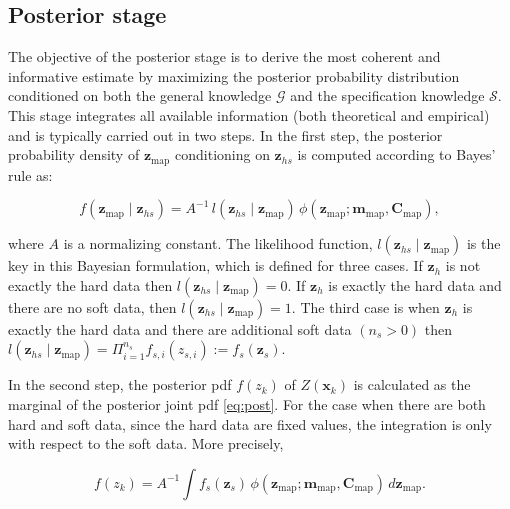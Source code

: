 \subsection{Posterior stage}\label{posterior-stage}

The objective of the posterior stage is to derive the most coherent and informative estimate by maximizing the posterior probability distribution conditioned on both the general knowledge \(\mathcal{G}\) and the specification knowledge \(\mathcal{S}\). This stage integrates all available information (both theoretical and empirical) and is typically carried out in two steps. In the first step, the posterior probability density of \(\boldsymbol{z}_\mathrm{map}\) conditioning on \(\boldsymbol{z}_{hs}\) is computed according to Bayes' rule as:

\begin{equation}
f(\boldsymbol{z}_\mathrm{map} \mid \boldsymbol{z}_{hs}) = A^{-1} \, l(\boldsymbol{z}_{hs}  \mid  \boldsymbol{z}_\mathrm{map}) \, \phi (\boldsymbol{z}_\mathrm{map}; \boldsymbol{m}_\mathrm{map}, \boldsymbol{C}_\mathrm{map})
\label{eq:post},
\end{equation}

where \(A\) is a normalizing constant. The likelihood function, \(l(\boldsymbol{z}_{hs}  \mid  \boldsymbol{z}_\mathrm{map})\) is the key in this Bayesian formulation, which is defined for three cases. If \(\boldsymbol{z}_h\) is not exactly the hard data then \(l(\boldsymbol{z}_{hs}  \mid  \boldsymbol{z}_\mathrm{map}) = 0\). If \(\boldsymbol{z}_h\) is exactly the hard data and there are no soft data, then \(l(\boldsymbol{z}_{hs}  \mid  \boldsymbol{z}_\mathrm{map}) = 1\). The third case is when \(\boldsymbol{z}_h\) is exactly the hard data and there are additional soft data \((n_s > 0)\) then \(l(\boldsymbol{z}_{hs}  \mid  \boldsymbol{z}_\mathrm{map}) = \Pi_{i=1}^{n_s} f_{s,i} (z_{s,i}) := f_s(\boldsymbol{z}_s)\).

In the second step, the posterior pdf \(f(z_k)\) of \(Z(\boldsymbol{x}_k)\) is calculated as the marginal of the posterior joint pdf \eqref{eq:post}. For the case when there are both hard and soft data, since the hard data are fixed values, the integration is only with respect to the soft data. More precisely,

\begin{equation}
f(z_k) = A^{-1} \int f_s(\boldsymbol{z}_s) \, \phi(\boldsymbol{z}_\mathrm{map}; \boldsymbol{m}_\mathrm{map}, \boldsymbol{C}_\mathrm{map}) \, d\boldsymbol{z}_\mathrm{map}
\label{eq:ort}.
\end{equation}

